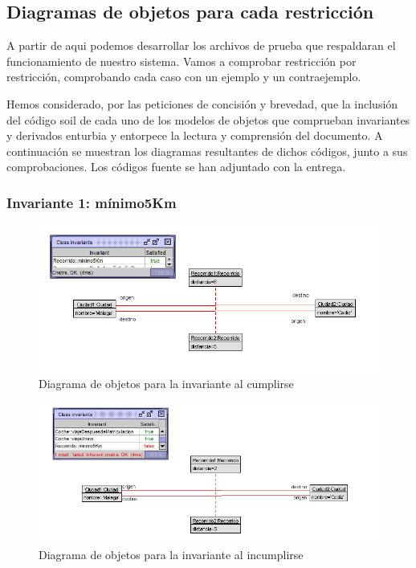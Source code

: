 \documentclass[12pt.a4paper]{article}
\begin{document}
\subsection{Diagramas de objetos para cada restricción}
A partir de aqui podemos desarrollar los archivos de prueba que respaldaran el funcionamiento de nuestro sistema. Vamos a comprobar restricción por restricción, comprobando cada caso con un ejemplo y un contraejemplo.

Hemos considerado, por las peticiones de concisión y brevedad, que la inclusión del código soil de cada uno de los modelos de objetos que comprueban invariantes y derivados enturbia y  entorpece la lectura y comprensión del documento. A continuación se muestran los diagramas resultantes de dichos códigos, junto a sus comprobaciones. Los códigos fuente se han adjuntado con la entrega.

\subsubsection{Invariante 1: mínimo5Km}

\vspace{1.0 cm}
\begin{figure}[H]
     \includegraphics[width=1\linewidth]{Soils/1_v2.png}
     \caption{Diagrama de objetos para la invariante al cumplirse}
     \label{Diagrama del sistema de aviacion}
\end{figure}

\begin{figure}[H]
     \includegraphics[width=1\linewidth]{Soils/1.jpg}
     \caption{Diagrama de objetos para la invariante al incumplirse}
     \label{Diagrama del sistema de aviacion}
\end{figure}
\end{document}
